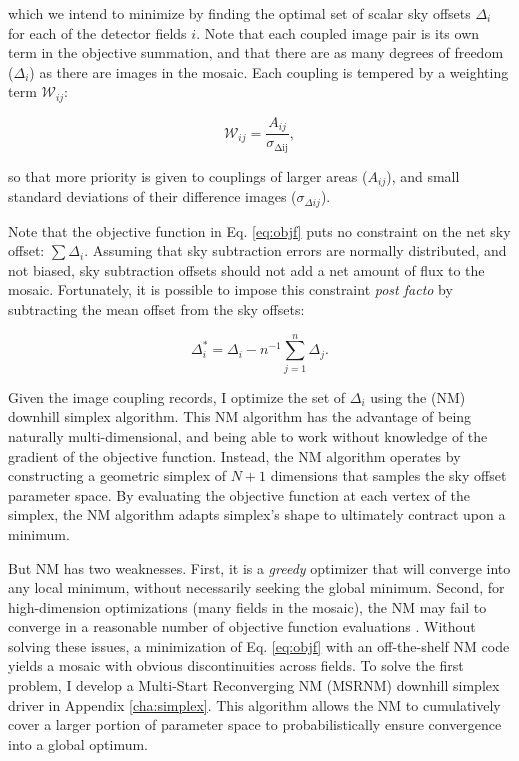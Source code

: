 \documentclass[iop]{emulateapj}
\begin{document}
\noindent which we intend to minimize by finding the optimal set of scalar sky offsets $\Delta_i$ for each of the detector fields $i$. Note that each coupled image pair is its own term in the objective summation, and that there are as many degrees of freedom ($\Delta_i$) as there are images in the mosaic. Each coupling is tempered by a weighting term $\mathcal{W}_{ij}$:

\begin{equation}
    \mathcal{W}_{ij} = \frac{A_{ij}}{\sigma_{\mathrm{\Delta ij}}},
\end{equation}

\noindent so that more priority is given to couplings of larger areas ($A_{ij}$), and small standard deviations of their difference images ($\sigma_{\Delta ij}$).

Note that the objective function in Eq. \ref{eq:objf} puts no constraint on the net sky offset: $\sum \Delta_i$. Assuming that sky subtraction errors are normally distributed, and not biased, sky subtraction offsets should not add a net amount of flux to the mosaic. Fortunately, it is possible to impose this constraint \textit{post facto} by subtracting the mean offset from the sky offsets:

\begin{equation}
    \Delta_i^* = \Delta_i - n^{-1}\sum_{j=1}^n \Delta_j.
    \label{eq:netzero}
\end{equation}

Given the image coupling records, I optimize the set of $\Delta_i$ using the \cite{Nelder:1965} (NM) downhill simplex algorithm. This NM algorithm has the advantage of being naturally multi-dimensional, and being able to work without knowledge of the gradient of the objective function. Instead, the NM algorithm operates by constructing a geometric simplex of $N+1$ dimensions that samples the sky offset parameter space. By evaluating the objective function at each vertex of the simplex, the NM algorithm adapts simplex's shape to ultimately contract upon a minimum.

But NM has two weaknesses. First, it is a \emph{greedy} optimizer that will converge into any local minimum, without necessarily seeking the global minimum. Second, for high-dimension optimizations (many fields in the mosaic), the NM may fail to converge in a reasonable number of objective function evaluations \citep{Neumann:2006}. Without solving these issues, a minimization of Eq. \ref{eq:objf} with an off-the-shelf NM code yields a mosaic with obvious discontinuities across fields. To solve the first problem, I develop a Multi-Start Reconverging NM (MSRNM) downhill simplex driver in Appendix \ref{cha:simplex}. This algorithm allows the NM to cumulatively cover a larger portion of parameter space to probabilistically ensure convergence into a global optimum.
\end{document}
